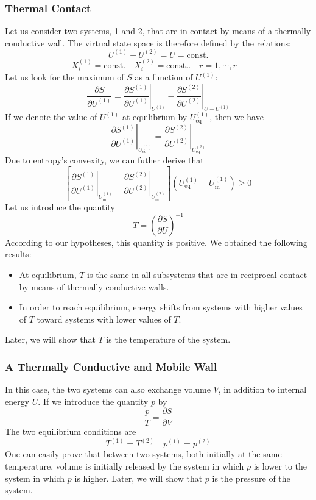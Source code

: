 \subsubsection{Thermal Contact}
Let us consider two systems, 1 and 2, that are in contact by means of a thermally conductive wall. The virtual state space is therefore defined by the relations:
\[U^{(1)} + U^{(2)} = U = \mathrm{const.}\]
\[X^{(1)}_{i} = \mathrm{const}. \quad X^{(2)}_{i} = \mathrm{const.}. \quad r = 1,\cdots,r \quad \]
Let us look for the maximum of $S$ as a function of $U^{(1)}$:
\[\frac{\partial S}{\partial U^{(1)}} = \left. \frac{\partial S^{(1)}}{\partial U^{(1)}} \right|_{U^{(1)}} -  \left. \frac{\partial S^{(2)}}{\partial U^{(2)}} \right|_{U-U^{(1)}}\]
If we denote the value of $U^{(1)}$ at equilibrium by $U^{(1)}_{\mathrm{eq}}$, then we have
\[\left. \frac{\partial S^{(1)}}{\partial U^{(1)}} \right|_{U^{(1)}_{\mathrm{eq}}} =  \left. \frac{\partial S^{(2)}}{\partial U^{(2)}} \right|_{U^{(2)}_{\mathrm{eq}}}\]
Due to entropy's convexity, we can futher derive that
\[\left[ \left. \frac{\partial S^{(1)}}{\partial U^{(1)}} \right|_{U^{(1)}_{\mathrm{in}}} -  \left. \frac{\partial S^{(2)}}{\partial U^{(2)}} \right|_{U^{(2)}_{\mathrm{in}}}\right] (U^{(1)}_{\mathrm{eq}} - U^{(1)}_{\mathrm{in}}) \geq 0\]
Let us introduce the quantity
\[T = \left( \frac{\partial S}{\partial U} \right)^{-1}\]
According to our hypotheses, this quantity is positive. We obtained the following results:
\begin{itemize}
\item At equilibrium, $T$ is the same in all subsystems that are in reciprocal contact by means of thermally conductive walls.
\item In order to reach equilibrium, energy shifts from systems with higher values of $T$ toward systems with lower values of $T$.
\end{itemize}
Later, we will show that $T$ is the temperature of the system.

\subsubsection{A Thermally Conductive and Mobile Wall}
In this case, the two systems can also exchange volume $V$, in addition to internal energy $U$. If we introduce the quantity $p$ by
\[\frac{p}{T} =  \frac{\partial S}{\partial V} \]
The two equilibrium conditions are
\[T^{(1)} = T^{(2)} \quad p^{(1)} = p^{(2)}\]
One can easily prove that between two systems, both initially at the same temperature, volume is initially released by the system in which $p$ is lower to the system in which $p$ is higher. Later, we will show that $p$ is the pressure of the system.

